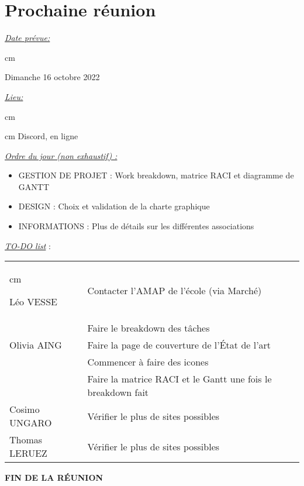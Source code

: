 \section{Prochaine réunion}
    \noindent
    \textit{\underline{Date prévue:}} 
    
     cm
    
    Dimanche 16 octobre 2022
    
    \vskip 0.25cm

    \noindent
    \textit{\underline{Lieu:}} 

  cm
    
     cm
    Discord, en ligne
    
    \vskip 0.25cm
    
    \noindent
    \textit{\underline{Ordre du jour (non exhaustif) :}}
    \begin{itemize}[label=\textbullet]
        \item GESTION DE PROJET : Work breakdown, matrice RACI et diagramme de GANTT
        \item DESIGN : Choix et validation de la charte graphique
        \item INFORMATIONS : Plus de détails sur les différentes associations
    \end{itemize}
    
    \vskip 0.25cm
    
    \noindent
    \textit{\underline{TO-DO list}} :
    
    \noindent
    \begin{tabularx}{\textwidth}{|p{3.2cm}|X|}
        \hline
        \vskip 0.1 cm
        \centerline{Léo VESSE}
        & Contacter l’AMAP de l’école (via Marché) \\
        \cline{2-2}
        & Faire le breakdown des tâches\\
        
        \hline
        
        \centerline{Olivia AING}
        & Faire la page de couverture de l’État de l’art\\
        \cline{2-2}
        & Commencer à faire des icones\\
        \cline{2-2}
        & Faire la matrice RACI et le Gantt une fois le breakdown fait\\
        
        \hline
        
        \centerline{Cosimo UNGARO}
        & Vérifier le plus de sites possibles\\
        
        \hline
        
        \centerline{Thomas LERUEZ}
        & Vérifier le plus de sites possibles\\
        
        \hline
    \end{tabularx}
    
    \vskip 2.0cm
    
    \begin{center}
        \textbf{FIN DE LA RÉUNION}
    \end{center}